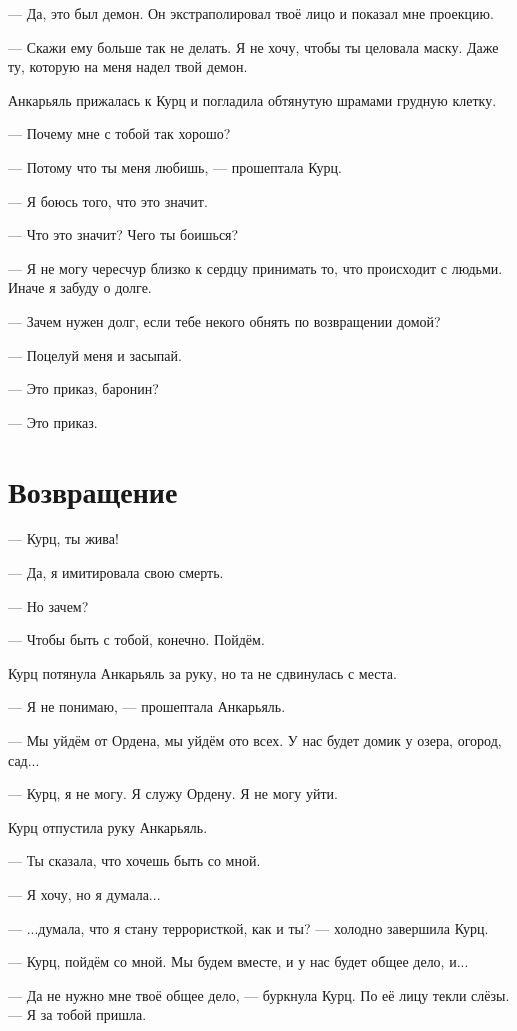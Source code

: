 \documentclass[a4paper,10pt,fleqn]{book}\usepackage{polyglossia}\setdefaultlanguage[babelshorthands=true]{russian}\setotherlanguage{english}\defaultfontfeatures{Ligatures=TeX,Mapping=tex-text}\usepackage{xcolor}\newcommand{\ml}[3]{#2}
\begin{document}
--- Да, это был демон.
Он экстраполировал твоё лицо и показал мне проекцию.

--- Скажи ему больше так не делать.
Я не хочу, чтобы ты целовала маску.
Даже ту, которую на меня надел твой демон.

Анкарьяль прижалась к Курц и погладила обтянутую шрамами грудную клетку.

--- Почему мне с тобой так хорошо?

--- Потому что ты меня любишь, --- прошептала Курц.

--- Я боюсь того, что это значит.

--- Что это значит?
Чего ты боишься?

--- Я не могу чересчур близко к сердцу принимать то, что происходит с людьми.
Иначе я забуду о долге.

--- Зачем нужен долг, если тебе некого обнять по возвращении домой?

--- Поцелуй меня и засыпай.

--- Это приказ, баронин?

--- Это приказ.

\section{Возвращение}

--- Курц, ты жива!

--- Да, я имитировала свою смерть.

--- Но зачем?

--- Чтобы быть с тобой, конечно.
Пойдём.

Курц потянула Анкарьяль за руку, но та не сдвинулась с места.

--- Я не понимаю, --- прошептала Анкарьяль.

--- Мы уйдём от Ордена, мы уйдём ото всех.
У нас будет домик у озера, огород, сад...

--- Курц, я не могу.
Я служу Ордену.
Я не могу уйти.

Курц отпустила руку Анкарьяль.

--- Ты сказала, что хочешь быть со мной.

--- Я хочу, но я думала...

--- ...думала, что я стану террористкой, как и ты? --- холодно завершила Курц.

--- Курц, пойдём со мной.
Мы будем вместе, и у нас будет общее дело, и...

--- Да не нужно мне твоё общее дело, --- буркнула Курц.
По её лицу текли слёзы.
--- Я за тобой пришла.
\end{document}
